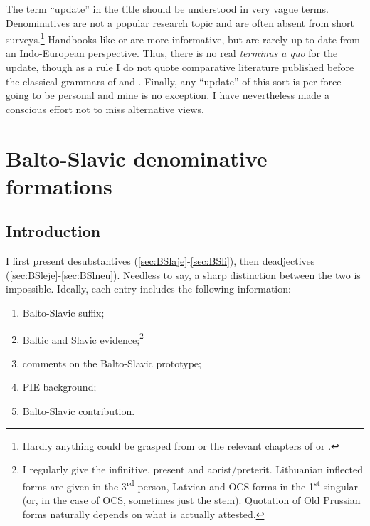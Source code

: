 \documentclass[output=paper,colorlinks,citecolor=brown]{langscibook}
\begin{document}
The term “update” in the title should be understood in very vague terms. Denominatives are not a popular research topic and are often absent from short surveys.\footnote{Hardly anything could be grasped from \citet{Hock2005} or the relevant chapters of \citet{Kapovic2017} or \citet{Klein2018}.} Handbooks like \citet[86--93]{Birnbaum1997} or \citet[\textit{passim}]{Schmalstieg2000} are more informative, but are rarely up to date from an Indo-European perspective. Thus, there is no real \textit{terminus a quo} for the update, though as a rule I do not quote comparative literature published before the classical grammars of \citet{Stang1966} and \citet{Vaillant1966}. Finally, any “update” of this sort is per force going to be personal and mine is no exception. I have nevertheless made a conscious effort not to miss alternative views.

\section{Balto-Slavic denominative formations}
\label{sec:BSldenom}

\subsection{Introduction}
\label{sec:BSldenomintro}

I first present desubstantives (\ref{sec:BSlaje}-\ref{sec:BSli}), then deadjectives  (\ref{sec:BSleje}-\ref{sec:BSlneu}). Needless to say, a sharp distinction between the two is impossible. Ideally, each entry includes the following information: 

\begin{enumerate}
    \item Balto-Slavic suffix; 
    \item Baltic and Slavic evidence;\footnote{I regularly give the infinitive, present and aorist/preterit. Lithuanian inflected forms are given in the 3\textsuperscript{rd} person, Latvian and OCS forms in the 1\textsuperscript{st} singular (or, in the case of OCS, sometimes just the stem). Quotation of Old Prussian forms naturally depends on what is actually attested.}
    \item comments on the Balto-Slavic prototype;
    \item PIE background;
    \item Balto-Slavic contribution.
\end{enumerate}
\end{document}
